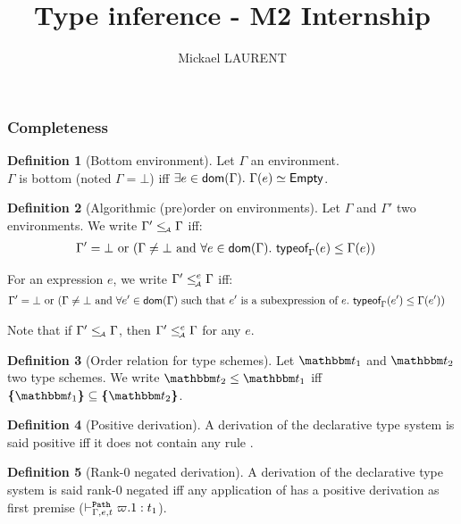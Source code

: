 \documentclass[a4paper]{article}
\title{\vspace{1.5cm}Type inference - M2 Internship}
\author{Mickael LAURENT}
\date{\vspace{-5ex}}
\theoremstyle{definition}
\newtheorem{definition}{Definition}
\begin{document}
  \maketitle

  \subsubsection{Completeness}

    \begin{definition}[Bottom environment]
      Let $\Gamma$ an environment.\\
      $\Gamma$ is bottom (noted $\Gamma = \bot$) iff $\exists e\in\dom\Gamma.\ \Gamma(e)\simeq\Empty$.
    \end{definition}

    \begin{definition}[Algorithmic (pre)order on environments]
    Let $\Gamma$ and $\Gamma'$ two environments. We write $\Gamma' \leq_{\!\scriptscriptstyle\mathcal{A}} \Gamma$ iff:
    \begin{align*}
        &\Gamma'=\bot \text{ or } (\Gamma\neq\bot \text{ and } \forall e \in \textsf{dom}(\Gamma).\ \textsf{typeof}_{\Gamma}(e) \leq \Gamma(e))
    \end{align*}

    For an expression $e$, we write $\Gamma' \leq_{\!\scriptscriptstyle\mathcal{A}}^e \Gamma$ iff:
    \begin{align*}
      &\Gamma'=\bot \text{ or } (\Gamma\neq\bot \text{ and } \forall e' \in \dom \Gamma \text{ such that $e'$ is a subexpression of $e$}.\ \tyof {e'} \Gamma \leq \Gamma({e'}))
    \end{align*}

    Note that if $\Gamma' \leq_{\!\scriptscriptstyle\mathcal{A}} \Gamma$, then $\Gamma' \leq_{\!\scriptscriptstyle\mathcal{A}}^e \Gamma$ for any $e$.
    \end{definition}

    \begin{definition}[Order relation for type schemes]
      Let $\ts_1$ and $\ts_2$ two type schemes. We write $\ts_2 \leq \ts_1$ iff $\tsint {\ts_1} \subseteq \tsint{\ts_2}$.
    \end{definition}

    \begin{definition}[Positive derivation]
      A derivation of the declarative type system is said positive iff it does not contain any rule .
    \end{definition}

    \begin{definition}[Rank-0 negated derivation]
      A derivation of the declarative type system is said rank-0 negated iff any application of 
      has a positive derivation as first premise ($\vdash^{\texttt{Path}}_{\Gamma,e,t} \varpi.1:t_1$).
    \end{definition}
\end{document}
